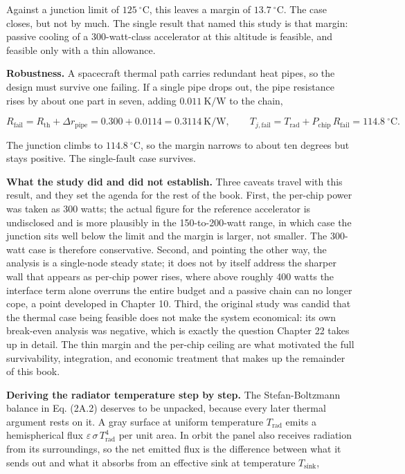 \documentclass[
  11pt,
  openany,
  oneside]{book}
\begin{document}
Against a junction limit of \(125\ ^\circ\mathrm{C}\), this leaves a
margin of \(13.7\ ^\circ\mathrm{C}\). The case closes, but not by much.
The single result that named this study is that margin: passive cooling
of a 300-watt-class accelerator at this altitude is feasible, and
feasible only with a thin allowance.

\textbf{Robustness.} A spacecraft thermal path carries redundant heat
pipes, so the design must survive one failing. If a single pipe drops
out, the pipe resistance rises by about one part in seven, adding
\(0.011\ \mathrm{K/W}\) to the chain,

\begin{equation}
R_{\mathrm{fail}} = R_{\mathrm{th}} + \Delta r_{\mathrm{pipe}} = 0.300 + 0.0114 = 0.3114\ \mathrm{K/W},
\qquad T_{j,\mathrm{fail}} = T_{\mathrm{rad}} + P_{\mathrm{chip}}\, R_{\mathrm{fail}} = 114.8\ ^\circ\mathrm{C}. \tag{2A.5}
\end{equation}

The junction climbs to \(114.8\ ^\circ\mathrm{C}\), so the margin
narrows to about ten degrees but stays positive. The single-fault case
survives.

\textbf{What the study did and did not establish.} Three caveats travel
with this result, and they set the agenda for the rest of the book.
First, the per-chip power was taken as 300 watts; the actual figure for
the reference accelerator is undisclosed and is more plausibly in the
150-to-200-watt range, in which case the junction sits well below the
limit and the margin is larger, not smaller. The 300-watt case is
therefore conservative. Second, and pointing the other way, the analysis
is a single-node steady state; it does not by itself address the sharper
wall that appears as per-chip power rises, where above roughly 400 watts
the interface term alone overruns the entire budget and a passive chain
can no longer cope, a point developed in Chapter 10. Third, the original
study was candid that the thermal case being feasible does not make the
system economical: its own break-even analysis was negative, which is
exactly the question Chapter 22 takes up in detail. The thin margin and
the per-chip ceiling are what motivated the full survivability,
integration, and economic treatment that makes up the remainder of this
book.

\textbf{Deriving the radiator temperature step by step.} The
Stefan-Boltzmann balance in Eq. (2A.2) deserves to be unpacked, because
every later thermal argument rests on it. A gray surface at uniform
temperature \(T_{\mathrm{rad}}\) emits a hemispherical flux
\(\varepsilon\,\sigma\,T_{\mathrm{rad}}^4\) per unit area. In orbit the
panel also receives radiation from its surroundings, so the net emitted
flux is the difference between what it sends out and what it absorbs
from an effective sink at temperature \(T_{\mathrm{sink}}\),
\end{document}
